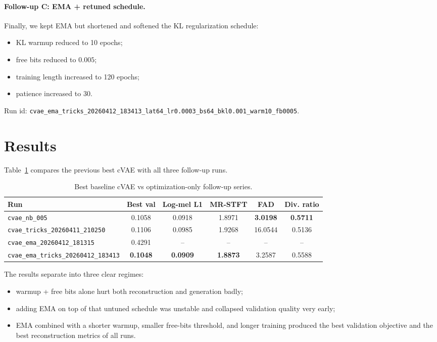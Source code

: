 \documentclass[10pt]{article}
\begin{document}
\paragraph{Follow-up C: EMA + retuned schedule.}
Finally, we kept EMA but shortened and softened the KL regularization schedule:
\begin{itemize}
\item KL warmup reduced to 10 epochs;
\item free bits reduced to \(0.005\);
\item training length increased to 120 epochs;
\item patience increased to 30.
\end{itemize}
Run id:
\texttt{cvae\_ema\_tricks\_20260412\_183413\_lat64\_lr0.0003\_bs64\_bkl0.001\_warm10\_fb0005}.

\section{Results}
Table~\ref{tab:tricks_compare} compares the previous best cVAE with all three follow-up runs.

\begin{table}[h]
\centering
\caption{Best baseline cVAE vs optimization-only follow-up series.}
\label{tab:tricks_compare}
\begin{tabular}{lccccc}
\toprule
Run & Best val & Log-mel L1 & MR-STFT & FAD & Div. ratio \\
\midrule
\texttt{cvae\_nb\_005} & 0.1058 & 0.0918 & 1.8971 & \textbf{3.0198} & \textbf{0.5711} \\
\texttt{cvae\_tricks\_20260411\_210250} & 0.1106 & 0.0985 & 1.9268 & 16.0544 & 0.5136 \\
\texttt{cvae\_ema\_20260412\_181315} & 0.4291 & -- & -- & -- & -- \\
\texttt{cvae\_ema\_tricks\_20260412\_183413} & \textbf{0.1048} & \textbf{0.0909} & \textbf{1.8873} & 3.2587 & 0.5588 \\
\bottomrule
\end{tabular}
\end{table}

The results separate into three clear regimes:
\begin{itemize}
\item warmup + free bits alone hurt both reconstruction and generation badly;
\item adding EMA on top of that untuned schedule was unstable and collapsed validation quality very early;
\item EMA combined with a shorter warmup, smaller free-bits threshold, and longer training produced the best validation objective and the best reconstruction metrics of all runs.
\end{itemize}
\end{document}
